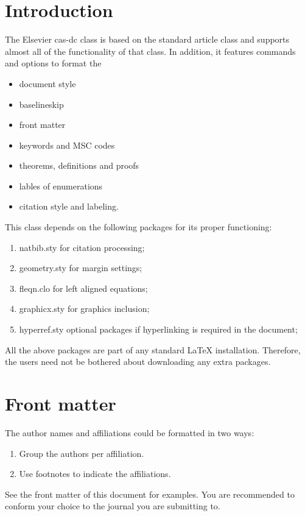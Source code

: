 \documentclass[a4paper,fleqn]{cas-dc}
\begin{document}
\section{Introduction}

The Elsevier cas-dc class is based on the
standard article class and supports almost all of the functionality of
that class. In addition, it features commands and options to format the
\begin{itemize} \item document style \item baselineskip \item front
matter \item keywords and MSC codes \item theorems, definitions and
proofs \item lables of enumerations \item citation style and labeling.
\end{itemize}

This class depends on the following packages
for its proper functioning:

\begin{enumerate}
\itemsep=0pt
\item {natbib.sty} for citation processing;
\item {geometry.sty} for margin settings;
\item {fleqn.clo} for left aligned equations;
\item {graphicx.sty} for graphics inclusion;
\item {hyperref.sty} optional packages if hyperlinking is
  required in the document;
\end{enumerate}  

All the above packages are part of any
standard \LaTeX{} installation.
Therefore, the users need not be
bothered about downloading any extra packages.

\section{Front matter}

The author names and affiliations could be formatted in two ways:
\begin{enumerate}[(1)]
\item Group the authors per affiliation.
\item Use footnotes to indicate the affiliations.
\end{enumerate}
See the front matter of this document for examples. 
You are recommended to conform your choice to the journal you 
are submitting to.
\end{document}
